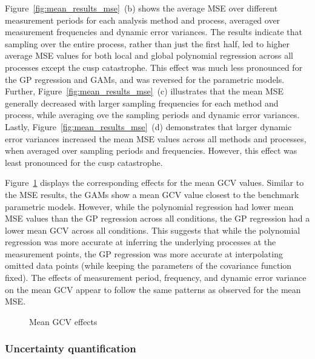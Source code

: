 \documentclass[man, floatsintext]{apa7}
\begin{document}
Figure~\ref{fig:mean_results_mse}~(b) shows the average MSE over different
measurement periods for each analysis method and process, averaged over
measurement frequencies and dynamic error variances. The results indicate that
sampling over the entire process, rather than just the first half, led to
higher average MSE values for both local and global polynomial regression
across all processes except the cusp catastrophe. This effect was much less
pronounced for the GP regression and GAMs, and was reversed for the parametric
models. Further, Figure~\ref{fig:mean_results_mse}~(c) illustrates that the
mean MSE generally decreased with larger sampling frequencies for each method
and process, while averaging ove the sampling periods and dynamic error
variances. Lastly, Figure~\ref{fig:mean_results_mse}~(d) demonstrates that
larger dynamic error variances increased the mean MSE values across all methods
and processes, when averaged over sampling periods and frequencies. However,
this effect was least pronounced for the cusp catastrophe.

Figure~\ref{fig:mean_results_gcv} displays the corresponding effects for the
mean GCV values. Similar to the MSE results, the GAMs show a mean GCV value
closest to the benchmark parametric models. However, while the polynomial
regression had lower mean MSE values than the GP regression across all
conditions, the GP regression had a lower mean GCV across all conditions. This
suggests that while the polynomial regression was more accurate at inferring
the underlying processes at the measurement points, the GP regression was more
accurate at interpolating omitted data points (while keeping the parameters of
the covariance function fixed). The effects of measurement period, frequency,
and dynamic error variance on the mean GCV appear to follow the same patterns
as observed for the mean MSE\@.

\begin{figure}[!t]
  \caption{Mean GCV effects}
  \label{fig:mean_results_gcv}
\end{figure}

\subsubsection{Uncertainty quantification}
\end{document}
